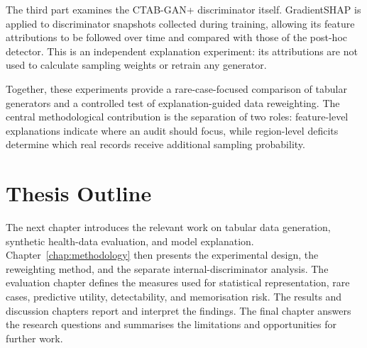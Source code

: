 The third part examines the CTAB-GAN+ discriminator itself. GradientSHAP is
applied to discriminator snapshots collected during training, allowing its
feature attributions to be followed over time and compared with those of the
post-hoc detector. This is an independent explanation experiment: its
attributions are not used to calculate sampling weights or retrain any
generator.

Together, these experiments provide a rare-case-focused comparison of tabular
generators and a controlled test of explanation-guided data reweighting. The
central methodological contribution is the separation of two roles:
feature-level explanations indicate where an audit should focus, while
region-level deficits determine which real records receive additional
sampling probability.

\section{Thesis Outline}

The next chapter introduces the relevant work on tabular data generation,
synthetic health-data evaluation, and model explanation.
Chapter~\ref{chap:methodology} then presents the experimental design, the
reweighting method, and the separate internal-discriminator analysis. The
evaluation chapter defines the measures used for statistical representation,
rare cases, predictive utility, detectability, and memorisation risk. The
results and discussion chapters report and interpret the findings. The final
chapter answers the research questions and summarises the limitations and
opportunities for further work.
